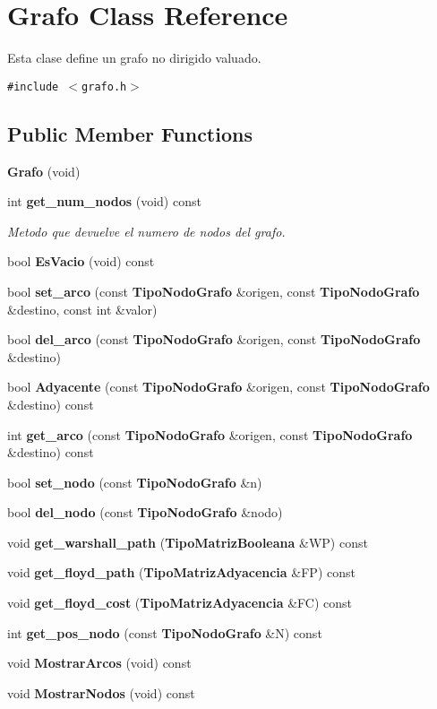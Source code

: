 \section{Grafo Class Reference}
\label{classGrafo}
Esta clase define un grafo no dirigido valuado.  


{\tt \#include $<$grafo.h$>$}

\subsection*{Public Member Functions}
\begin{CompactItemize}
\item 
{\bf Grafo} (void)
\item 
int {\bf get\_\-num\_\-nodos} (void) const
\begin{CompactList}\small\item\em Metodo que devuelve el numero de nodos del grafo. \item\end{CompactList}\item 
bool {\bf EsVacio} (void) const
\item 
bool {\bf set\_\-arco} (const {\bf TipoNodoGrafo} \&origen, const {\bf TipoNodoGrafo} \&destino, const int \&valor)
\item 
bool {\bf del\_\-arco} (const {\bf TipoNodoGrafo} \&origen, const {\bf TipoNodoGrafo} \&destino)
\item 
bool {\bf Adyacente} (const {\bf TipoNodoGrafo} \&origen, const {\bf TipoNodoGrafo} \&destino) const
\item 
int {\bf get\_\-arco} (const {\bf TipoNodoGrafo} \&origen, const {\bf TipoNodoGrafo} \&destino) const
\item 
bool {\bf set\_\-nodo} (const {\bf TipoNodoGrafo} \&n)
\item 
bool {\bf del\_\-nodo} (const {\bf TipoNodoGrafo} \&nodo)
\item 
void {\bf get\_\-warshall\_\-path} ({\bf TipoMatrizBooleana} \&WP) const
\item 
void {\bf get\_\-floyd\_\-path} ({\bf TipoMatrizAdyacencia} \&FP) const 
\item 
void {\bf get\_\-floyd\_\-cost} ({\bf TipoMatrizAdyacencia} \&FC) const 
\item 
int {\bf get\_\-pos\_\-nodo} (const {\bf TipoNodoGrafo} \&N) const
\item 
void {\bf MostrarArcos} (void) const
\item 
void {\bf MostrarNodos} (void) const

\end{CompactItemize}
